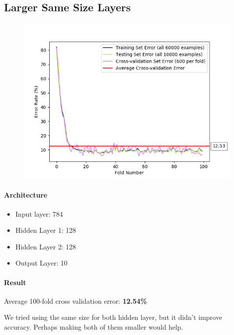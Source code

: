 \documentclass[11pt]{article}
\makeatletter
\def\maxwidth{\ifdim\Gin@nat@width>\linewidth\linewidth
    \else\Gin@nat@width\fi}
\let\Oldincludegraphics\includegraphics
\renewcommand{\includegraphics}[1]{\Oldincludegraphics[width=.8\maxwidth]{#1}}
\providecommand{\tightlist}{%
      \setlength{\itemsep}{0pt}\setlength{\parskip}{0pt}}
\makeatother
\begin{document}
\pagebreak

\subsection{Larger Same Size Layers}\label{larger-same-size-layers}

\begin{figure}[htbp]
\centering
\includegraphics{plots/ff-layersize-128-128.png}
\end{figure}

\paragraph{Architecture}\label{architecture-4}

\begin{itemize}
\tightlist
\item
  Input layer: 784
\item
  Hidden Layer 1: 128
\item
  Hidden Layer 2: 128
\item
  Output Layer: 10
\end{itemize}

\paragraph{Result}\label{result-4}

Average 100-fold cross validation error: \textbf{12.54\%}

We tried using the same size for both hidden layer, but it didn't
improve accuracy. Perhaps making both of them smaller would help.
\end{document}

